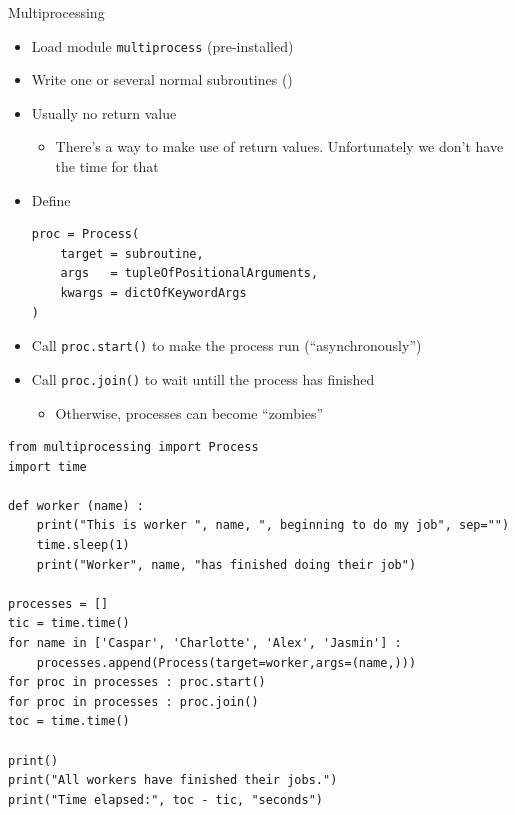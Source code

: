 \begin{frame}[fragile]{Multiprocessing}
%
\begin{itemize}
\item Load module \texttt{multiprocess} (pre-installed)
\item Write one or several normal subroutines ()
\item Usually no return value
	\begin{itemize}
	\item There's a way to make use of return values. Unfortunately we don't have the time for that
	\end{itemize}
\item Define 
\begin{verbatim}
proc = Process(
    target = subroutine,
    args   = tupleOfPositionalArguments,
    kwargs = dictOfKeywordArgs
)
\end{verbatim}
\item Call \texttt{proc.start()} to make the process run (\enquote{asynchronously})
\item Call \texttt{proc.join()} to wait untill the process has finished
	\begin{itemize}
	\item Otherwise, processes can become \enquote{zombies}
	\end{itemize}
\end{itemize}
%
\end{frame}


\begin{frame}[fragile]
%
\begin{codebox}
\begin{verbatim}
from multiprocessing import Process
import time

def worker (name) :
    print("This is worker ", name, ", beginning to do my job", sep="")
    time.sleep(1)
    print("Worker", name, "has finished doing their job")

processes = []
tic = time.time()
for name in ['Caspar', 'Charlotte', 'Alex', 'Jasmin'] :
    processes.append(Process(target=worker,args=(name,)))
for proc in processes : proc.start()
for proc in processes : proc.join()
toc = time.time()
    
print()
print("All workers have finished their jobs.")
print("Time elapsed:", toc - tic, "seconds")
\end{verbatim}
\end{codebox}
%
\end{frame}


